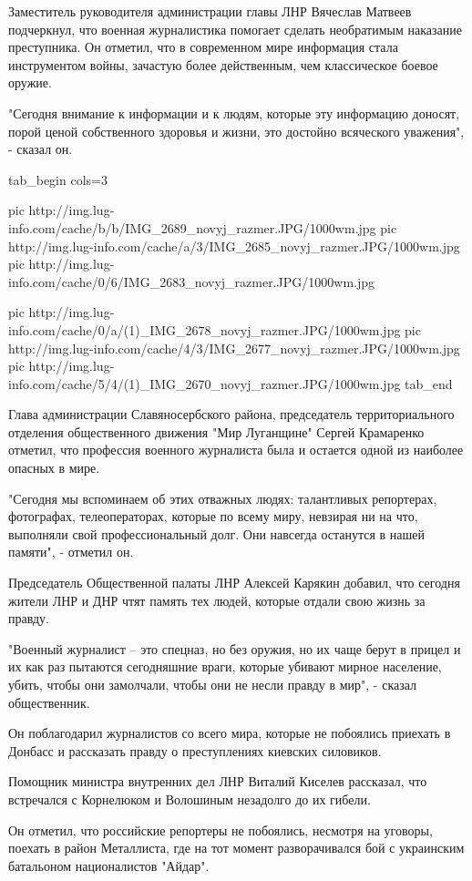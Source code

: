 Заместитель руководителя администрации главы ЛНР Вячеслав Матвеев подчеркнул,
что военная журналистика помогает сделать необратимым наказание преступника. Он
отметил, что в современном мире информация стала инструментом войны, зачастую
более действенным, чем классическое боевое оружие.

"Сегодня внимание к информации и к людям, которые эту информацию доносят, порой
ценой собственного здоровья и жизни, это достойно всяческого уважения", -
сказал он.

\ifcmt
tab_begin cols=3

	pic http://img.lug-info.com/cache/b/b/IMG_2689_novyj_razmer.JPG/1000wm.jpg
	pic http://img.lug-info.com/cache/a/3/IMG_2685_novyj_razmer.JPG/1000wm.jpg
	pic http://img.lug-info.com/cache/0/6/IMG_2683_novyj_razmer.JPG/1000wm.jpg

	pic http://img.lug-info.com/cache/0/a/(1)_IMG_2678_novyj_razmer.JPG/1000wm.jpg
	pic http://img.lug-info.com/cache/4/3/IMG_2677_novyj_razmer.JPG/1000wm.jpg
	pic http://img.lug-info.com/cache/5/4/(1)_IMG_2670_novyj_razmer.JPG/1000wm.jpg
tab_end
\fi

Глава администрации Славяносербского района, председатель территориального
отделения общественного движения "Мир Луганщине" Сергей Крамаренко отметил, что
профессия военного журналиста была и остается одной из наиболее опасных в мире.

"Сегодня мы вспоминаем об этих отважных людях: талантливых репортерах,
фотографах, телеоператорах, которые по всему миру, невзирая ни на что,
выполняли свой профессиональный долг. Они навсегда останутся в нашей памяти", -
отметил он.

Председатель Общественной палаты ЛНР Алексей Карякин добавил, что сегодня
жители ЛНР и ДНР чтят память тех людей, которые отдали свою жизнь за правду.

"Военный журналист – это спецназ, но без оружия, но их чаще берут в прицел и их
как раз пытаются сегодняшние враги, которые убивают мирное население, убить,
чтобы они замолчали, чтобы они не несли правду в мир", - сказал общественник.

Он поблагодарил журналистов со всего мира, которые не побоялись приехать в
Донбасс и рассказать правду о преступлениях киевских силовиков.

Помощник министра внутренних дел ЛНР Виталий Киселев рассказал, что встречался
с Корнелюком и Волошиным незадолго до их гибели.

Он отметил, что российские репортеры не побоялись, несмотря на уговоры, поехать
в район Металлиста, где на тот момент разворачивался бой с украинским
батальоном националистов "Айдар".

